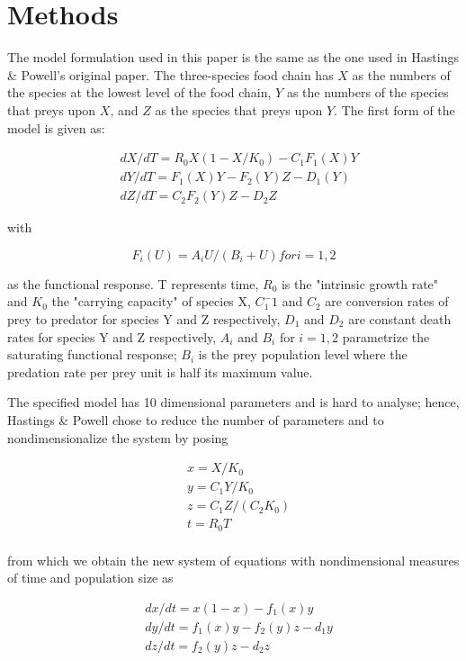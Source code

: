 \documentclass[12pt]{article}
\begin{document}
\section*{Methods}

The model formulation used in this paper is the same as the one used in Hastings \& Powell's original paper. The three-species food chain has $X$ as the numbers of the species at the lowest level of the food chain, $Y$ as the numbers of the species that preys upon $X$, and $Z$ as the species that preys upon $Y$. The first form of the model is given as:

\begin{align}
& dX/dT = R_0X(1 - X/K_0) - C_1F_1(X)Y \\
& dY/dT = F_1(X)Y - F_2(Y)Z - D_1(Y) \\
& dZ/dT = C_2F_2(Y)Z - D_2Z
\end{align}

with

$$
F_i(U) = A_iU/(B_i + U) for i = 1,2
$$

as the functional response. T represents time, $R_0$ is the "intrinsic growth rate" and $K_0$ the "carrying capacity" of species X, $C_1^-1$ and $C_2$ are conversion rates of prey to predator for species Y and Z respectively, $D_1$ and $D_2$ are constant death rates for species Y and Z respectively, $A_i$ and $B_i$ for $i = 1,2$ parametrize the saturating functional response; $B_i$ is the prey population level where the predation rate per prey unit is half its maximum value.

The specified model has 10 dimensional parameters and is hard to analyse; hence, Hastings  \& Powell chose to reduce the number of parameters and to nondimensionalize the system by posing

\begin{align}
& x = X/K_0 \\
& y = C_1Y/K_0 \\
& z = C_1Z/(C_2K_0) \\
& t = R_0T \\
\end{align}

from which we obtain the new system of equations with nondimensional measures of time and population size as

\begin{align}
& dx/dt = x(1 - x) - f_1(x)y \\
& dy/dt = f_1(x)y - f_2(y)z - d_1y \\
& dz/dt = f_2(y)z - d_2z \\
\end{align}
\end{document}
